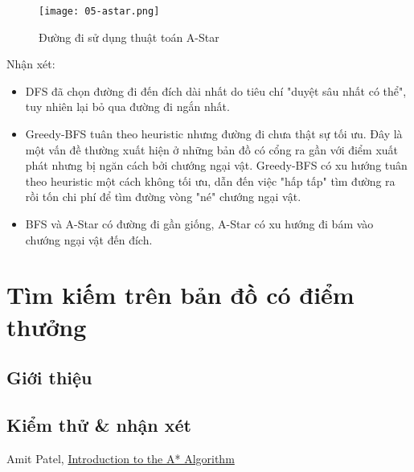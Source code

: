 \documentclass{article}
\begin{document}
\begin{figure}[H]
	\centering
	\texttt{[image: 05-astar.png]}
	\caption{Đường đi sử dụng thuật toán A-Star}
\end{figure}

Nhận xét:
\begin{itemize}
\item DFS đã chọn đường đi đến đích dài nhất do tiêu chí "duyệt sâu nhất có thể", tuy nhiên lại bỏ qua đường đi ngắn nhất.
\item Greedy-BFS tuân theo heuristic nhưng đường đi chưa thật sự tối ưu. Đây là một vấn đề thường xuất hiện ở những bản đồ có cổng ra gần với điểm xuất phát nhưng bị ngăn cách bởi chướng ngại vật. Greedy-BFS có xu hướng tuân theo heuristic một cách không tối ưu, dẫn đến việc "hấp tấp" tìm đường ra rồi tốn chi phí để tìm đường vòng "né" chướng ngại vật.
\item BFS và A-Star có đường đi gần giống, A-Star có xu hướng đi bám vào chướng ngại vật đến đích.
\end{itemize}

\section{Tìm kiếm trên bản đồ có điểm thưởng}
\subsection{Giới thiệu}

\subsection{Kiểm thử \& nhận xét}

\begin{thebibliography}{2}
Amit Patel, \href{https://www.redblobgames.com/pathfinding/a-star/introduction.html}{Introduction to the A* Algorithm}
\end{thebibliography}
\end{document}
